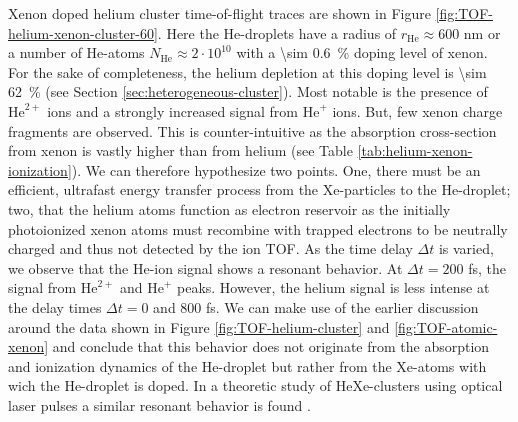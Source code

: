 Xenon doped helium cluster time-of-flight traces are shown in Figure \ref{fig:TOF-helium-xenon-cluster-60}. Here the He-droplets have a radius of $r_{\text{He}}\approx 600$ nm or a number of He-atoms $N_{\text{He}}\approx 2\cdot 10^{10}$ with a \SI{\sim 0.6}{\percent} doping level of xenon. For the sake of completeness, the helium depletion at this doping level is \SI{\sim 62}{\percent} (see Section \ref{sec:heterogeneous-cluster}). Most notable is the presence of $\text{He}^{2+}$ ions and a strongly increased signal from $\text{He}^{+}$ ions. But, few xenon charge fragments are observed. This is counter-intuitive as the absorption cross-section from xenon is vastly higher than from helium (see Table \ref{tab:helium-xenon-ionization}). We can therefore hypothesize two points. One, there must be an efficient, ultrafast energy transfer process from the Xe-particles to the He-droplet; two, that the helium atoms function as electron reservoir as the initially photoionized xenon atoms must recombine with trapped electrons to be neutrally charged and thus not detected by the ion TOF. As the time delay $\Delta t$ is varied, we observe that the He-ion signal shows a resonant behavior. At $\Delta t = 200$ fs, the signal from $\text{He}^{2+}$ and $\text{He}^{+}$ peaks. However, the helium signal is less intense at the delay times $\Delta t = 0$ and 800 fs. We can make use of the earlier discussion around the data shown in Figure \ref{fig:TOF-helium-cluster} and \ref{fig:TOF-atomic-xenon} and conclude that this behavior does not originate from the absorption and ionization dynamics of the He-droplet but rather from the Xe-atoms with wich the He-droplet is doped. In a theoretic study of HeXe-clusters using optical laser pulses a similar resonant behavior is found \citep{Mikaberidze-2008-PRA}.\\[1\baselineskip]
